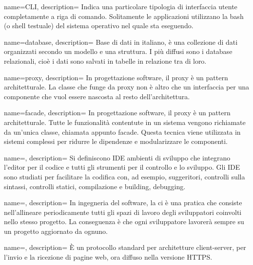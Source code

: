 {
  name=CLI,
  description={ Indica una particolare tipologia di interfaccia utente completamente a riga di comando. Solitamente le applicazioni
  utilizzano la bash (o shell testuale) del sistema operativo nel quale sta eseguendo. }
}

{
  name=database,
  description={ Base di dati in italiano, è una collezione di dati organizzati secondo un modello e una struttura. I più diffusi sono i
  database relazionali, cioè i dati sono salvati in tabelle in relazione tra di loro. }
}

{
  name={proxy},
  description={ In progettazione software, il proxy è un pattern architetturale. La classe che funge da proxy non è altro che un interfaccia
  per una componente che vuol essere nascosta al resto dell'architettura. }
}

{
  name={facade},
  description={ In progettazione software, il proxy è un pattern architetturale. Tutte le funzionalità contentute in un sistema vengono
  richiamate da un'unica classe, chiamata appunto facade. Questa tecnica viene utilizzata in sistemi complessi per ridurre le dipendenze e
  modularizzare le componenti. }
}

{
  name=,
  description={ Si definiscono IDE ambienti di sviluppo che integrano l'editor per il codice e tutti gli strumenti per il controllo e lo
  sviluppo. Gli IDE sono studiati per facilitare la codifica con, ad esempio, suggeritori, controlli sulla sintassi, controlli statici,
  compilazione e building, debugging.  }
}

{
  name=,
  description={ In ingegneria del software, la \acrlong{ci} è una pratica che consiste nell'allineare periodicamente tutti gli spazi di
  lavoro degli sviluppatori coinvolti nello stesso progetto. La conseguenza è che ogni sviluppatore lavorerà sempre su un progetto
  aggiornato da ognuno. }
}


{
  name=,
  description={ È un protocollo standard per architetture client-server, per l'invio e la ricezione di pagine web, ora diffuso nella
  versione HTTPS. }
}
